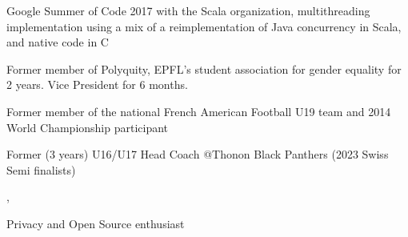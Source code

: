 


\begin{cventries}
	
	
	\cventry
	{} %
	{}
	{}
	{}
	{ %
		\begin{cvitems}
			\item Google Summer of Code 2017 with the Scala organization, multithreading implementation using a mix of a reimplementation of Java concurrency in Scala, and native code in C
			\item {Former member of Polyquity, EPFL's student association for gender equality for 2 years. Vice President for 6 months.}
			\item {Former member of the national French American Football U19 team and 2014 World Championship participant
			\item Former (3 years) U16/U17 Head Coach @Thonon Black Panthers (2023 Swiss Semi finalists)},
			\item {Privacy and Open Source enthusiast}
		\end{cvitems}
	}
	
	
	
	
\end{cventries}